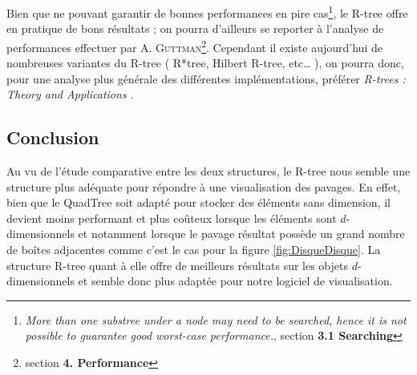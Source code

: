  Bien que ne pouvant garantir de bonnes performances en pire cas\footnote{\og \emph{More than one substree under a node may need to be searched, hence it is not possible to guarantee good worst-case performance.}\fg{}\cite{Guttman}, section \textbf{3.1 Searching}}, le R-tree offre en pratique de bons résultats ; on pourra d'ailleurs se reporter à l'analyse de performances effectuer par A. \textsc{Guttman}\footnote{section \textbf{4. Performance}\cite{Guttman}}. Cependant il existe aujourd'hui de nombreuses variantes du R-tree ( R*tree, Hilbert R-tree, etc\dots{} ), on pourra donc, pour une analyse plus générale des différentes implémentations, préférer \og\emph{R-trees : Theory and Applications} \fg{}\cite{poulos}.

\subsection{Conclusion}
Au vu de l'étude comparative entre les deux structures, le R-tree nous semble une structure plus adéquate pour répondre à une visualisation des pavages. En effet, bien que le QuadTree soit adapté pour stocker des éléments sans dimension, il devient moins performant et plus coûteux lorsque les éléments sont $d$-dimensionnels et notamment lorsque le pavage résultat possède un grand nombre de boîtes adjacentes comme c'est le cas pour la figure \ref{fig:DisqueDisque}. La structure R-tree quant à elle offre de meilleurs résultats sur les objets $d$-dimensionnels et semble donc plus adaptée pour notre logiciel de visualisation.

